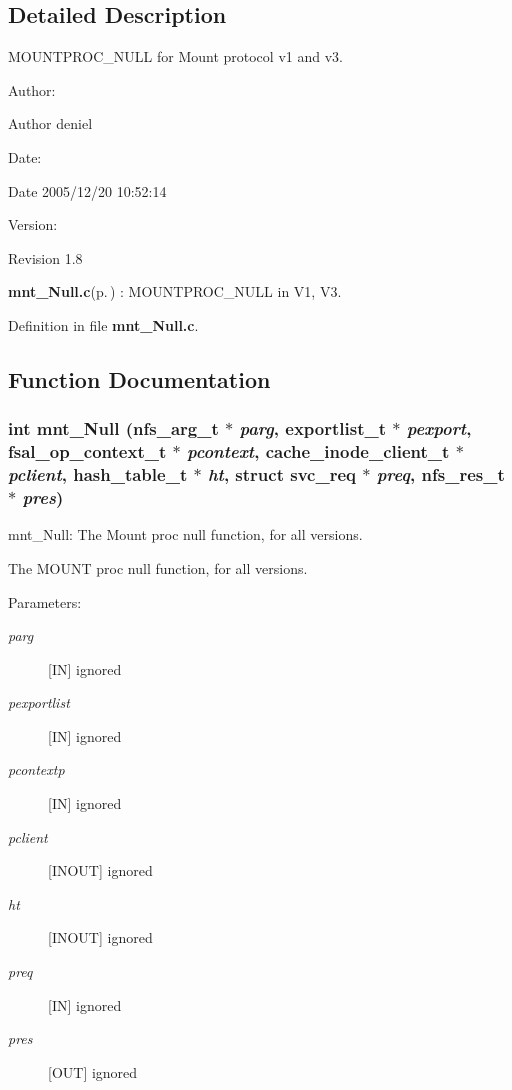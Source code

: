 \subsection{Detailed Description}
MOUNTPROC\_\-NULL for Mount protocol v1 and v3. 

\begin{Desc}
\item[Author:]\begin{Desc}
\item[Author]deniel \end{Desc}
\end{Desc}
\begin{Desc}
\item[Date:]\begin{Desc}
\item[Date]2005/12/20 10:52:14 \end{Desc}
\end{Desc}
\begin{Desc}
\item[Version:]\begin{Desc}
\item[Revision]1.8 \end{Desc}
\end{Desc}
{\bf mnt\_\-Null.c}{\rm (p.\,\pageref{mnt__Null_8c})} : MOUNTPROC\_\-NULL in V1, V3.

Definition in file {\bf mnt\_\-Null.c}.

\subsection{Function Documentation}
\subsubsection{\setlength{\rightskip}{0pt plus 5cm}int mnt\_\-Null (nfs\_\-arg\_\-t $\ast$ {\em parg}, exportlist\_\-t $\ast$ {\em pexport}, fsal\_\-op\_\-context\_\-t $\ast$ {\em pcontext}, cache\_\-inode\_\-client\_\-t $\ast$ {\em pclient}, hash\_\-table\_\-t $\ast$ {\em ht}, struct svc\_\-req $\ast$ {\em preq}, nfs\_\-res\_\-t $\ast$ {\em pres})}\label{mnt__Null_8c_a0}


mnt\_\-Null: The Mount proc null function, for all versions.

The MOUNT proc null function, for all versions.

\begin{Desc}
\item[Parameters:]
\begin{description}
\item[{\em parg}][IN] ignored \item[{\em pexportlist}][IN] ignored \item[{\em pcontextp}][IN] ignored \item[{\em pclient}][INOUT] ignored \item[{\em ht}][INOUT] ignored \item[{\em preq}][IN] ignored \item[{\em pres}][OUT] ignored \end{description}
\end{Desc}


